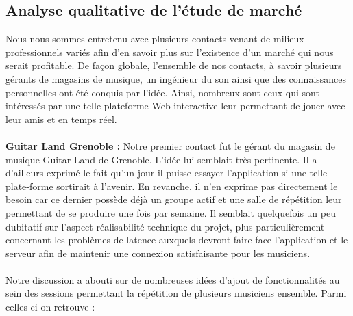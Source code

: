 \documentclass[a4,12pt]{article}
\begin{document}
\subsection{Analyse qualitative de l'étude de marché}
Nous nous sommes entretenu avec plusieurs contacts venant de milieux professionnels variés afin d'en savoir plus sur l'existence d'un marché qui nous serait profitable. De façon globale, l'ensemble de nos contacts, à savoir plusieurs gérants de magasins de musique, un ingénieur du son ainsi que des connaissances personnelles ont été conquis par l'idée. Ainsi, nombreux sont ceux qui sont intéressés par une telle plateforme Web interactive leur permettant de jouer avec leur amis et en temps réel.\\
\\

\textbf{Guitar Land Grenoble :}
    Notre premier contact fut le gérant du magasin de musique Guitar Land de Grenoble. L'idée lui semblait très pertinente. Il a d'ailleurs exprimé le fait qu'un jour il puisse essayer l'application si une telle plate-forme sortirait à l'avenir. En revanche, il n'en exprime pas directement le besoin car ce dernier possède déjà un groupe actif et une salle de répétition leur permettant de se produire une fois par semaine. Il semblait quelquefois un peu dubitatif sur l'aspect réalisabilité technique du projet, plus particulièrement concernant les problèmes de latence auxquels devront faire face l'application et le serveur afin de maintenir une connexion satisfaisante pour les musiciens.\\
    \\
    Notre discussion a abouti sur de nombreuses idées d'ajout de fonctionnalités au sein des sessions permettant la répétition de plusieurs musiciens ensemble. Parmi celles-ci on retrouve :
\end{document}
